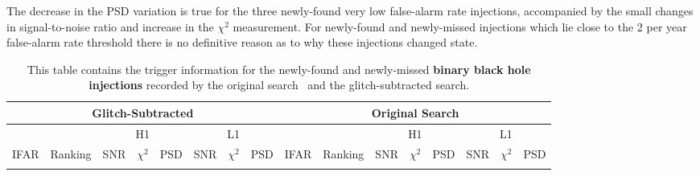 The decrease in the PSD variation is true for the three newly-found very low false-alarm rate injections, accompanied by the small changes in signal-to-noise ratio and increase in the $\chi^{2}$ measurement. For newly-found and newly-missed injections which lie close to the 2 per year false-alarm rate threshold there is no definitive reason as to why these injections changed state.

\newpage
{} %
\begin{landscape}
\begin{table}[tb]
\centering
\caption{\label{tab:apdx_changed_snr_bbh}This table contains the trigger information for the newly-found and newly-missed \textbf{binary black hole injections} recorded by the original search~\cite{gwtc3} and the glitch-subtracted search.} 
\begin{tabular}{|c|c|c|c|c|c|c|c||c|c|c|c|c|c|c|c|}
\hline
\multicolumn{8}{|c||}{Glitch-Subtracted} & \multicolumn{8}{c|}{Original Search} \\
\hline
\multicolumn{2}{|c|}{} & \multicolumn{3}{c|}{H1} & \multicolumn{3}{c||}{L1} & \multicolumn{2}{c|}{} & \multicolumn{3}{c|}{H1} & \multicolumn{3}{c|}{L1}\\
\hline
IFAR & Ranking & SNR & $\chi^{2}$ & PSD & SNR & $\chi^{2}$ & PSD & IFAR & Ranking & SNR & $\chi^{2}$ & PSD & SNR & $\chi^{2}$ & PSD \\ &


\end{tabular}
\end{table}
\end{landscape}
